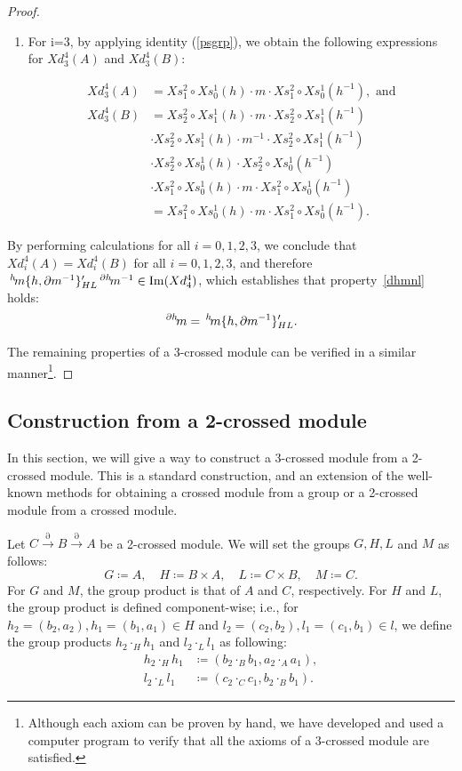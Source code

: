 \documentclass{tac}
\newcommand{\act}[1]{\,\sp{#1}\!}
\begin{document}
\begin{proof}
\begin{enumerate}[label=(\roman*)]
\item For i=3, by applying identity (\ref{psgrp}), we obtain the following expressions for $Xd^4_3(A)$ and $Xd^4_3(B)$:

\begin{align*}
Xd^4_3 (A) &=
Xs^2_1\circ Xs^1_0(h)\cdot m\cdot Xs^2_1\circ Xs^1_0(h^{-1}), \text{ and}\\
Xd^4_3 (B) &=
Xs^2_2\circ Xs^1_1(h)\cdot m\cdot Xs^2_2\circ Xs^1_1(h^{-1})\\
&\cdot Xs^2_2\circ Xs^1_1(h)\cdot m^{-1}\cdot Xs^2_2\circ Xs^1_1(h^{-1})\\
&\cdot Xs^2_2\circ Xs^1_0(h)\cdot Xs^2_2\circ Xs^1_0(h^{-1})\\
&\cdot Xs^2_1\circ Xs^1_0(h)\cdot m\cdot Xs^2_1\circ Xs^1_0(h^{-1})\\
&=Xs^2_1\circ Xs^1_0(h)\cdot m\cdot Xs^2_1\circ Xs^1_0(h^{-1}).
\end{align*}
\end{enumerate}

By performing calculations for all $i=0,1,2,3$, we conclude that \( Xd^4_i(A) = Xd^4_i(B) \) for all \( i = 0,1,2,3 \), and therefore $\act{h}m\{h,\partial m^{-1}\}'_{HL}\act{\partial h}m^{-1} \in {\rm Im}(Xd^4_4)$, which establishes that property \ref{dhmnl} holds:
 \[
 \act{\partial h}m = \act{h}m\{h,\partial m^{-1}\}'_{HL}.
 \]

The remaining properties of a 3-crossed module can be verified in a similar manner\footnote{Although each axiom can be proven by hand, we have developed and used a computer program to verify that all the axioms of a 3-crossed module are satisfied.}.
\end{proof}


\subsection{Construction from a 2-crossed module}

In this section, we will give a way to construct a 3-crossed module from a 2-crossed module. This is a standard construction, and an extension of the well-known methods for obtaining a crossed module from a group or a 2-crossed module from a crossed module.

Let $C\xrightarrow{\partial}B \xrightarrow{\partial} A$ be a 2-crossed module. We will set the groups $G,H,L$ and $M$ as follows:
\[
G \coloneqq A, \quad H \coloneqq B\times A, \quad L \coloneqq C\times B, \quad M \coloneqq C.
\]
For $G$ and $M$, the group product is that of $A$ and $C$, respectively. For $H$ and $L$, the group product is defined component-wise; i.e., for $h_2=(b_2, a_2), h_1=(b_1, a_1) \in H$ and $l_2=(c_2, b_2), l_1=(c_1, b_1) \in l$, we define the group products $h_2 \cdot_H h_1$ and $l_2 \cdot_L l_1$ as following:
\begin{equation}
\label{ex2:prod}
\begin{aligned}
h_2 \cdot_H h_1 &\coloneqq (b_2 \cdot_B b_1, a_2 \cdot_A a_1), \\
l_2 \cdot_L l_1 &\coloneqq (c_2 \cdot_C c_1, b_2 \cdot_B b_1).
\end{aligned}
\end{equation}
\end{document}
